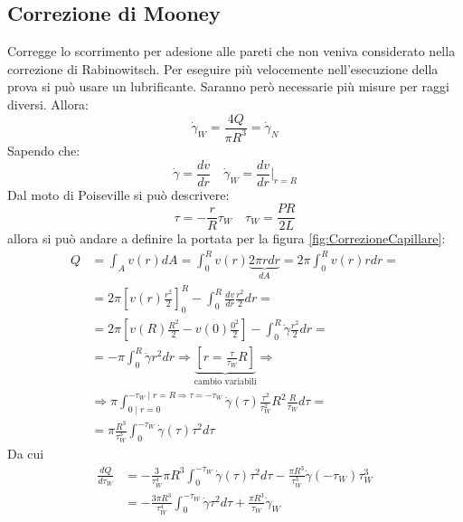 \subsection{Correzione di Mooney}
Corregge lo scorrimento per adesione alle pareti che non veniva considerato nella correzione di Rabinowitsch.
Per eseguire più velocemente nell'esecuzione della prova si può usare un lubrificante. Saranno però necessarie più misure per raggi diversi.
Allora:
\begin{equation}
\dot{\gamma}_W  = \frac{4 Q}{\pi R^3} = \dot{\gamma}_N
\end{equation}
Sapendo che:
\begin{equation}
\dot{\gamma} = \frac{dv}{dr} \quad \dot{\gamma}_W = \frac{dv}{dr}\Big|_{r = R}
\end{equation}
Dal moto di Poiseville si può descrivere:
\begin{equation}
\tau = - \frac{r}{R}\tau_W \quad \tau_W = \frac{PR}{2L}
\end{equation}
allora si può andare a definire la portata per la figura \ref{fig:CorrezioneCapillare}:
\begin{equation}
\begin{split}
Q &= \int_A{v(r) dA} = \int_0^R{v(r) \underbrace{2\pi r dr}_{dA}} = 2\pi \int_0^R{v(r) r dr} =\\
&= 2\pi \left[v(r) \frac{r^2}{2}\right]_0^R - \int_0^R{\frac{dv}{dr}\frac{r^2}{2}dr} =\\
&= 2\pi \left[v(R)\frac{R^2}{2} - v(0)\frac{0^2}{2}\right] - \int_0^R{\dot{\gamma}\frac{r^2}{2}dr} =\\
&= -\pi \int_0^R{\dot{\gamma}r^2 dr} \Rightarrow \underbrace{\left[r = \frac{\tau}{\tau_W}R\right]}_{\text{cambio variabili}} \Rightarrow\\
&\Rightarrow \pi \int_{0 \mid r = 0}^{-\tau_W \mid r=R \Rightarrow \tau = -\tau_W}{\dot{\gamma}(\tau)\frac{\tau^2}{\tau_W^2}R^2\frac{R}{\tau_W}d\tau}=\\
&= \pi \frac{R^3}{\tau_W^3}\int_0^{-\tau_W}{\dot{\gamma}(\tau) \tau^2 d\tau}
\end{split}
\end{equation}
Da cui
\begin{equation}
\begin{split}
\frac{dQ}{d\tau_W} &= -\frac{3}{\tau_W^4}\pi R^3%
\int_0^{-\tau_W}{\dot{\gamma}(\tau)\tau^2 d\tau} - \frac{\pi R^3}{\tau_W^3} \dot{\gamma}(-\tau_W)\tau_W^3\\
&= -\frac{3\pi R^3}{\tau_W^4}\int_0^{-\tau_W}{\dot{\gamma}\tau^2 d\tau} + \frac{\pi R^3}{\tau_W}\dot{\gamma}_W
\end{split}
\end{equation}
